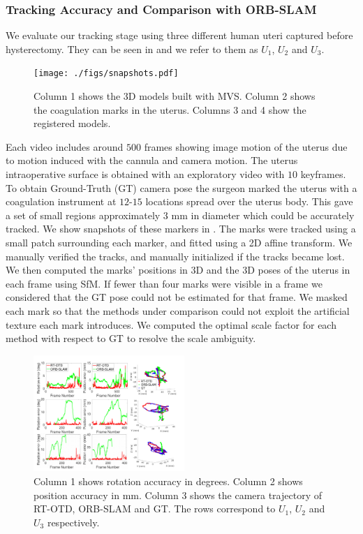 \subsubsection{Tracking Accuracy and Comparison with ORB-SLAM}
We evaluate our tracking stage using three different human uteri captured before hysterectomy. They can be seen in  and we refer to them as $U_1$, $U_2$ and $U_3$.
\begin{figure}[htbp]
  \centering
  \texttt{[image: ./figs/snapshots.pdf]}
\caption{Column 1 shows the 3D models built with MVS. Column 2 shows the coagulation marks in the uterus. Columns 3 and 4 show the registered models.}
\label{fig:hister}
\end{figure}
 Each video includes around $500$ frames showing image motion of the uterus due to motion induced with the cannula and camera motion. The uterus intraoperative surface is obtained with an exploratory video with $10$ keyframes. To obtain Ground-Truth (GT) camera pose the surgeon marked the uterus with a coagulation instrument at $12$-$15$ locations spread over the uterus body. This gave a set of small regions approximately $3$ mm in diameter which could be accurately tracked. We show snapshots of these markers in . The marks were tracked using a small patch surrounding each marker, and fitted using a 2D affine transform. We manually verified the tracks, and manually initialized if the tracks became lost. We then computed the marks’ positions in 3D and the 3D poses of the uterus in each frame using SfM. If fewer than four marks were visible in a frame we considered that the GT pose could not be estimated for that frame. We masked each mark so that the methods under comparison could not exploit the artificial texture each mark introduces. We computed the optimal scale factor for each method with respect to GT to resolve the scale ambiguity.
\begin{figure}[htbp]
  \centering
  \includegraphics[width=0.51\textwidth]{./figs/Accuracy_errors.pdf}
\caption{Column 1 shows rotation accuracy in degrees. Column 2 shows position accuracy in mm. Column 3 shows the camera trajectory of RT-OTD, ORB-SLAM and GT. The rows correspond to $U_1$, $U_2$ and $U_3$ respectively.}
\label{fig:hister_results}
\end{figure}
